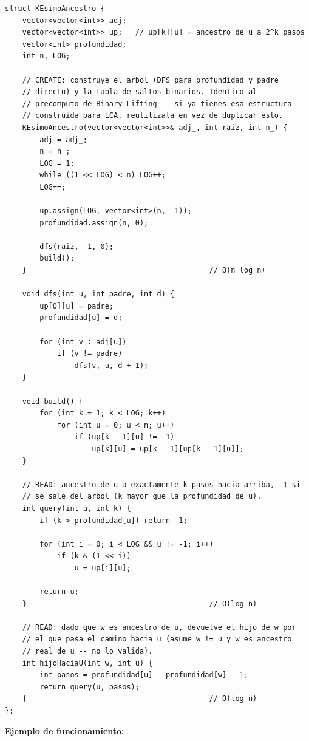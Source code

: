 \documentclass[10pt,a4paper,twocolumn]{article}
\begin{document}
\begin{lstlisting}[style=cpp]
struct KEsimoAncestro {
    vector<vector<int>> adj;
    vector<vector<int>> up;   // up[k][u] = ancestro de u a 2^k pasos
    vector<int> profundidad;
    int n, LOG;

    // CREATE: construye el arbol (DFS para profundidad y padre
    // directo) y la tabla de saltos binarios. Identico al
    // precomputo de Binary Lifting -- si ya tienes esa estructura
    // construida para LCA, reutilizala en vez de duplicar esto.
    KEsimoAncestro(vector<vector<int>>& adj_, int raiz, int n_) {
        adj = adj_;
        n = n_;
        LOG = 1;
        while ((1 << LOG) < n) LOG++;
        LOG++;

        up.assign(LOG, vector<int>(n, -1));
        profundidad.assign(n, 0);

        dfs(raiz, -1, 0);
        build();
    }                                          // O(n log n)

    void dfs(int u, int padre, int d) {
        up[0][u] = padre;
        profundidad[u] = d;

        for (int v : adj[u])
            if (v != padre)
                dfs(v, u, d + 1);
    }

    void build() {
        for (int k = 1; k < LOG; k++)
            for (int u = 0; u < n; u++)
                if (up[k - 1][u] != -1)
                    up[k][u] = up[k - 1][up[k - 1][u]];
    }

    // READ: ancestro de u a exactamente k pasos hacia arriba, -1 si
    // se sale del arbol (k mayor que la profundidad de u).
    int query(int u, int k) {
        if (k > profundidad[u]) return -1;

        for (int i = 0; i < LOG && u != -1; i++)
            if (k & (1 << i))
                u = up[i][u];

        return u;
    }                                          // O(log n)

    // READ: dado que w es ancestro de u, devuelve el hijo de w por
    // el que pasa el camino hacia u (asume w != u y w es ancestro
    // real de u -- no lo valida).
    int hijoHaciaU(int w, int u) {
        int pasos = profundidad[u] - profundidad[w] - 1;
        return query(u, pasos);
    }                                          // O(log n)
};
\end{lstlisting}

\textbf{Ejemplo de funcionamiento:}
\end{document}
